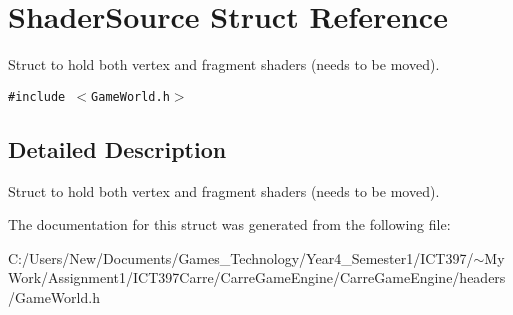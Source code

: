 \hypertarget{struct_shader_source}{
\section{ShaderSource Struct Reference}
\label{struct_shader_source}
}
Struct to hold both vertex and fragment shaders (needs to be moved).  


{\tt \#include $<$GameWorld.h$>$}



\subsection{Detailed Description}
Struct to hold both vertex and fragment shaders (needs to be moved). 

The documentation for this struct was generated from the following file:\begin{CompactItemize}
\item 
C:/Users/New/Documents/Games\_\-Technology/Year4\_\-Semester1/ICT397/$\sim$My Work/Assignment1/ICT397Carre/CarreGameEngine/CarreGameEngine/headers/GameWorld.h\end{CompactItemize}
